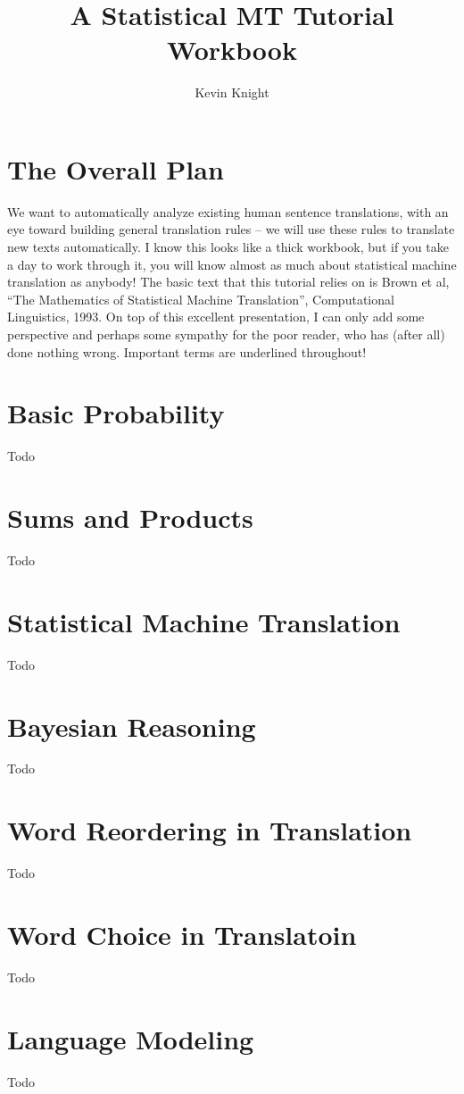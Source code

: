 \documentclass[a4paper]{article}
\title{A Statistical MT Tutorial Workbook}
\author{Kevin Knight}
\begin{document}
\maketitle

\section{The Overall Plan}
We want to automatically analyze existing human sentence translations, with an eye toward building
general translation rules -- we will use these rules to translate new texts automatically.
I know this looks like a thick workbook, but if you take a day to work through it, you will know almost as
much about statistical machine translation as anybody!
The basic text that this tutorial relies on is Brown et al, ``The Mathematics of Statistical Machine
Translation'', Computational Linguistics, 1993. On top of this excellent presentation, I can only add some
perspective and perhaps some sympathy for the poor reader, who has (after all) done nothing wrong.
Important terms are underlined throughout!

\section{Basic Probability}
Todo

\section{Sums and Products}
Todo

\section{Statistical Machine Translation}
Todo


\section{Bayesian Reasoning}
Todo

\section{Word Reordering in Translation}
Todo

\section{Word Choice in Translatoin}
Todo

\section{Language Modeling}
Todo
\end{document}
